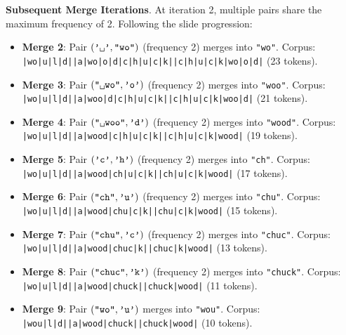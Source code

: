 \documentclass[../../main.tex]{subfiles}
\begin{document}
\noindent\textbf{Subsequent Merge Iterations}.\newline
At iteration 2, multiple pairs share the maximum frequency of 2. Following the slide progression:
\begin{itemize}
    \item \textbf{Merge 2}: Pair $(\text{\texttt{'\textvisiblespace{}'}}, \text{\texttt{"wo"}})$ (frequency 2) merges into \texttt{"\textvisiblespace{}wo"}.
    Corpus: \texttt{|wo|u|l|d|\textvisiblespace{}|a|\textvisiblespace{}wo|o|d|c|h|u|c|k|\textvisiblespace{}|c|h|u|c|k|\textvisiblespace{}wo|o|d|} (23 tokens).
    \item \textbf{Merge 3}: Pair $(\text{\texttt{"\textvisiblespace{}wo"}}, \text{\texttt{'o'}})$ (frequency 2) merges into \texttt{"\textvisiblespace{}woo"}.
    Corpus: \texttt{|wo|u|l|d|\textvisiblespace{}|a|\textvisiblespace{}woo|d|c|h|u|c|k|\textvisiblespace{}|c|h|u|c|k|\textvisiblespace{}woo|d|} (21 tokens).
    \item \textbf{Merge 4}: Pair $(\text{\texttt{"\textvisiblespace{}woo"}}, \text{\texttt{'d'}})$ (frequency 2) merges into \texttt{"\textvisiblespace{}wood"}.
    Corpus: \texttt{|wo|u|l|d|\textvisiblespace{}|a|\textvisiblespace{}wood|c|h|u|c|k|\textvisiblespace{}|c|h|u|c|k|\textvisiblespace{}wood|} (19 tokens).
    \item \textbf{Merge 5}: Pair $(\text{\texttt{'c'}}, \text{\texttt{'h'}})$ (frequency 2) merges into \texttt{"ch"}.
    Corpus: \texttt{|wo|u|l|d|\textvisiblespace{}|a|\textvisiblespace{}wood|ch|u|c|k|\textvisiblespace{}|ch|u|c|k|\textvisiblespace{}wood|} (17 tokens).
    \item \textbf{Merge 6}: Pair $(\text{\texttt{"ch"}}, \text{\texttt{'u'}})$ (frequency 2) merges into \texttt{"chu"}.
    Corpus: \texttt{|wo|u|l|d|\textvisiblespace{}|a|\textvisiblespace{}wood|chu|c|k|\textvisiblespace{}|chu|c|k|\textvisiblespace{}wood|} (15 tokens).
    \item \textbf{Merge 7}: Pair $(\text{\texttt{"chu"}}, \text{\texttt{'c'}})$ (frequency 2) merges into \texttt{"chuc"}.
    Corpus: \texttt{|wo|u|l|d|\textvisiblespace{}|a|\textvisiblespace{}wood|chuc|k|\textvisiblespace{}|chuc|k|\textvisiblespace{}wood|} (13 tokens).
    \item \textbf{Merge 8}: Pair $(\text{\texttt{"chuc"}}, \text{\texttt{'k'}})$ (frequency 2) merges into \texttt{"chuck"}.
    Corpus: \texttt{|wo|u|l|d|\textvisiblespace{}|a|\textvisiblespace{}wood|chuck|\textvisiblespace{}|chuck|\textvisiblespace{}wood|} (11 tokens).
    \item \textbf{Merge 9}: Pair $(\text{\texttt{"wo"}}, \text{\texttt{'u'}})$ merges into \texttt{"wou"}.
    Corpus: \texttt{|wou|l|d|\textvisiblespace{}|a|\textvisiblespace{}wood|chuck|\textvisiblespace{}|chuck|\textvisiblespace{}wood|} (10 tokens).
\end{itemize}
\end{document}
